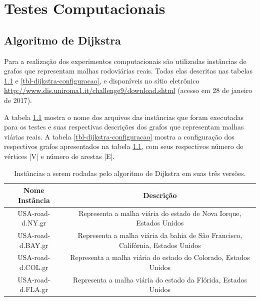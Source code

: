\chapter{Testes Computacionais}
\label{sec-testes}

\section{Algoritmo de Dijkstra}
\label{sec-dijkstra-experimentos}
Para a realização dos experimentos computacionais são utilizadas instâncias de grafos que representam malhas rodoviárias reais. Todas elas descritas nas tabelas \ref{tbl-dijkstra-instancias} e \ref{tbl-dijkstra-configuracao}, e disponíveis no sítio eletrônico \url{http://www.dis.uniroma1.it/challenge9/download.shtml} (acesso em 28 de janeiro de 2017).

A tabela \ref{tbl-dijkstra-instancias} mostra o nome dos arquivos das instâncias que foram executadas para os testes e suas respectivas descrições dos grafos que representam malhas viárias reais. A tabela \ref{tbl-dijkstra-configuracao} mostra a configuração dos respectivos grafos apresentados na tabela \ref{tbl-dijkstra-instancias}, com seus respectivos número de vértices |V| e número de arestas |E|.
\begin{table}[H]
\caption{Instâncias a serem rodadas pelo algoritmo de Dijkstra em suas três versões.}
\label{tbl-dijkstra-instancias}
\centering
\begin{adjustbox}{max width=\textwidth}
\begin{tabular}{|c|c|}
\hline 
\textbf{Nome Instância} & \textbf{Descrição} \\ 
\hline 
USA-road-d.NY.gr & Representa a malha viária do estado de Nova Iorque, Estados Unidos \\ 
\hline 
USA-road-d.BAY.gr & Representa a malha viária da bahia de São Francisco, Califórnia, Estados Unidos \\ 
\hline 
USA-road-d.COL.gr & Representa a malha viária do estado do Colorado, Estados Unidos \\ 
\hline 
USA-road-d.FLA.gr & Representa a malha viária do estado da Flórida, Estados Unidos \\ 
\hline 
\end{tabular}
\end{adjustbox}
\end{table}

